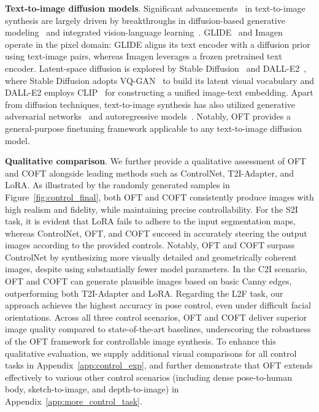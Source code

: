 \textbf{Text-to-image diffusion models}. Significant advancements~\cite{saharia2022photorealistic,ramesh2022hierarchical,rombach2022high,gu2022vector,nichol2022glide} in text-to-image synthesis are largely driven by breakthroughs in diffusion-based generative modeling~\cite{ho2020denoising,song2021score,song2021denoising,dhariwal2021diffusion} and integrated vision-language learning~\cite{su2020vlbert,lu2019vilbert,radford2021learning,wang2021simvlm,li2022blip,li2023blip,alayrac2022flamingo,schuhmann2022laion}. GLIDE~\cite{nichol2022glide} and Imagen~\cite{saharia2022photorealistic} operate in the pixel domain: GLIDE aligns its text encoder with a diffusion prior using text-image pairs, whereas Imagen leverages a frozen pretrained text encoder. Latent-space diffusion is explored by Stable Diffusion~\cite{rombach2022high} and DALL-E2~\cite{ramesh2022hierarchical}, where Stable Diffusion adopts VQ-GAN~\cite{esser2021taming} to build its latent visual vocabulary and DALL-E2 employs CLIP~\cite{radford2021learning} for constructing a unified image-text embedding. Apart from diffusion techniques, text-to-image synthesis has also utilized generative adversarial networks~\cite{reed2016generative,zhang2017stackgan,xu2018attngan,li2019controllable} and autoregressive models~\cite{ramesh2021zero,ding2021cogview,wu2022nuwa,yuscaling}. Notably, OFT provides a general-purpose finetuning framework applicable to any text-to-image diffusion model.

\textbf{Qualitative comparison}. We further provide a qualitative assessment of OFT and COFT alongside leading methods such as ControlNet, T2I-Adapter, and LoRA. As illustrated by the randomly generated samples in Figure~\ref{fig:control_final}, both OFT and COFT consistently produce images with high realism and fidelity, while maintaining precise controllability. For the S2I task, it is evident that LoRA fails to adhere to the input segmentation maps, whereas ControlNet, OFT, and COFT succeed in accurately steering the output images according to the provided controls. Notably, OFT and COFT surpass ControlNet by synthesizing more visually detailed and geometrically coherent images, despite using substantially fewer model parameters. In the C2I scenario, OFT and COFT can generate plausible images based on basic Canny edges, outperforming both T2I-Adapter and LoRA. Regarding the L2F task, our approach achieves the highest accuracy in pose control, even under difficult facial orientations. Across all three control scenarios, OFT and COFT deliver superior image quality compared to state-of-the-art baselines, underscoring the robustness of the OFT framework for controllable image synthesis. To enhance this qualitative evaluation, we supply additional visual comparisons for all control tasks in Appendix~\ref{app:control_exp}, and further demonstrate that OFT extends effectively to various other control scenarios (including dense pose-to-human body, sketch-to-image, and depth-to-image) in Appendix~\ref{app:more_control_task}.

